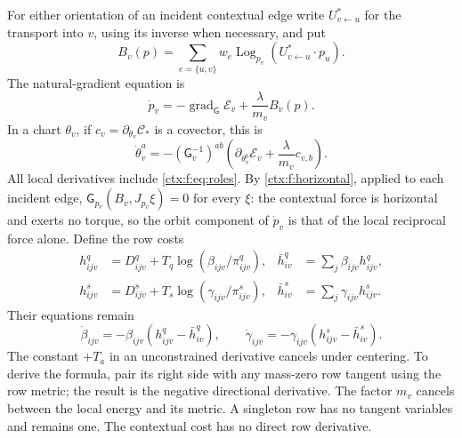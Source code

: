 For either orientation of an incident contextual edge write $U^*_{v\leftarrow u}$ for the transport into $v$, using its inverse when necessary, and put
\begin{equation}
 B_v(p)=\sum_{e=\{u,v\}}w_e\operatorname{Log}_{p_v}(U^*_{v\leftarrow u}\cdot p_u).
 \label{ctx:f:eq:B}
\end{equation}
The natural-gradient equation \cite{Amari1998} is
\begin{equation}
 \boxed{\dot p_v=-\operatorname{grad}_{\mathsf G}\mathcal E_v+\frac{\lambda}{m_v}B_v(p).}
 \label{ctx:f:eq:flow}
\end{equation}
In a chart $\theta_v$, if $c_v=\partial_{\theta_v}\mathcal C_*$ is a covector, this is
\begin{equation}
 \dot\theta_v^a=-(\mathsf G_v^{-1})^{ab}
 \left(\partial_{\theta_v^b}\mathcal E_v+\frac{\lambda}{m_v}c_{v,b}\right).
\end{equation}
All local derivatives include \cref{ctx:f:eq:roles}. By \cref{ctx:f:horizontal}, applied to each incident edge, $\mathsf G_{p_v}(B_v,J_{p_v}\xi)=0$ for every $\xi$: the contextual force is horizontal and exerts no torque, so the orbit component of $\dot p_v$ is that of the local reciprocal force alone. Define the row costs
\begin{align}
 h^q_{ijv}&=D^q_{ijv}+T_q\log(\beta_{ijv}/\pi^q_{ijv}),&
 \bar h^q_{iv}&=\sum_j\beta_{ijv}h^q_{ijv},\\
 h^s_{ijv}&=D^s_{ijv}+T_s\log(\gamma_{ijv}/\pi^s_{ijv}),&
 \bar h^s_{iv}&=\sum_j\gamma_{ijv}h^s_{ijv}.
\end{align}
Their equations remain
\begin{equation}
 \dot\beta_{ijv}=-\beta_{ijv}(h^q_{ijv}-\bar h^q_{iv}),\qquad
 \dot\gamma_{ijv}=-\gamma_{ijv}(h^s_{ijv}-\bar h^s_{iv}).
 \label{ctx:f:eq:rowflow}
\end{equation}
The constant $+T_a$ in an unconstrained derivative cancels under centering. To derive the formula, pair its right side with any mass-zero row tangent using the row metric; the result is the negative directional derivative. The factor $m_v$ cancels between the local energy and its metric. A singleton row has no tangent variables and remains one. The contextual cost has no direct row derivative.

